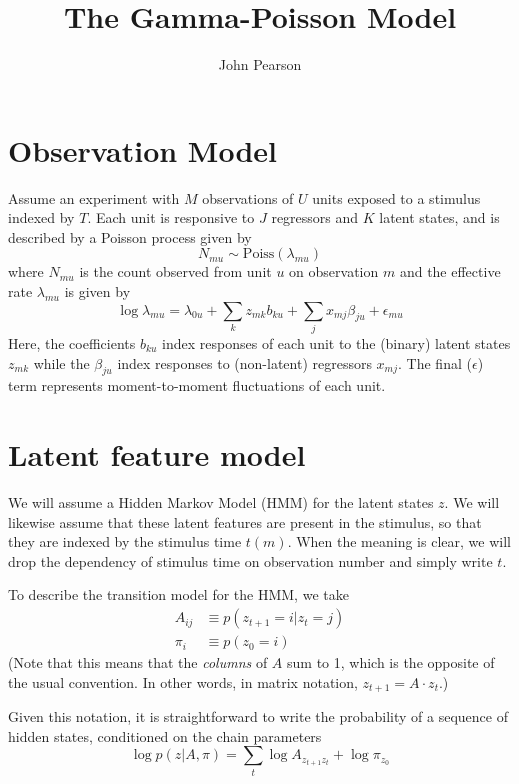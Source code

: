 \documentclass[11pt]{article}
\begin{document}
\title{The Gamma-Poisson Model}
\author{John Pearson}
\maketitle

\section{Observation Model}
Assume an experiment with $M$ observations of $U$ units exposed to a stimulus indexed by $T$. Each unit is responsive to $J$ regressors and $K$ latent states, and is described by a Poisson process given by 
\begin{equation}
    N_{mu} \sim \mathrm{Poiss}(\lambda_{mu}) 
\end{equation}
where $N_{mu}$ is the count observed from unit $u$ on observation $m$ and the effective rate $\lambda_{mu}$ is given by 
\begin{equation}
    \label{loglambda}
    \log \lambda_{mu} = \lambda_{0u} + \sum_k z_{mk} b_{ku} + \sum_j x_{mj} \beta_{ju} + \epsilon_{mu}
\end{equation}
Here, the coefficients $b_{ku}$ index responses of each unit to the (binary) latent states $z_{mk}$ while the $\beta_{ju}$ index responses to (non-latent) regressors $x_{mj}$. The final ($\epsilon$) term represents moment-to-moment fluctuations of each unit.

\section{Latent feature model}
We will assume a Hidden Markov Model (HMM) for the latent states $z$. We will likewise assume that these latent features are present in the stimulus, so that they are indexed by the stimulus time $t(m)$. When the meaning is clear, we will drop the dependency of stimulus time on observation number and simply write $t$.

To describe the transition model for the HMM, we take
\begin{align}
    A_{ij} &\equiv p(z_{t+1} = i|z_t = j) \\
    \pi_i &\equiv p(z_0 = i)
\end{align}
(Note that this means that the \emph{columns} of $A$ sum to 1, which is the opposite of the usual convention. In other words, in matrix notation, $z_{t+1} = A \cdot z_t$.)

Given this notation, it is straightforward to write the probability of a sequence of hidden states, conditioned on the chain parameters
\begin{equation}
    \log p(z|A, \pi) = \sum_t \log A_{z_{t+1} z_t} + \log \pi_{z_0}
\end{equation}
\end{document}

